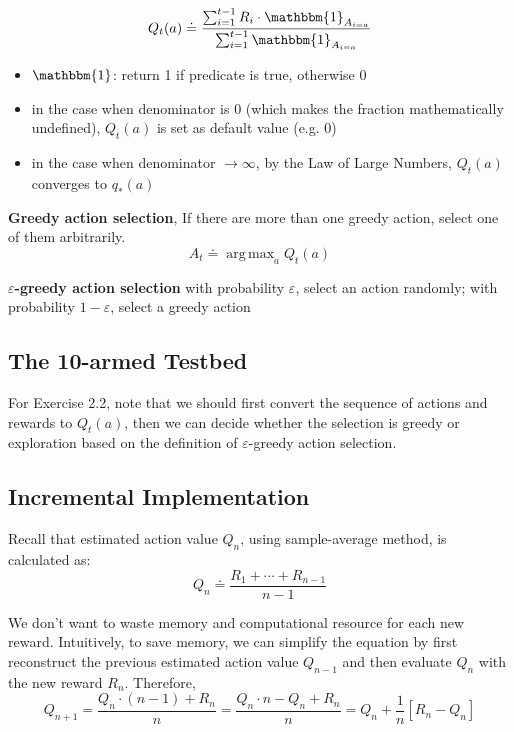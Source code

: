 \documentclass[lang=en,mode=geye,device=normal,color=blue,14pt]{elegantnote}
\DeclareMathOperator*{\1}{\mathbbm{1}}
\DeclareMathOperator*{\argmax}{arg\,max}
\begin{document}
$$ Q_t(a) \doteq \frac{\sum_{i=1}^{t-1}R_i \cdot \1_{A_{i=a}}}{\sum_{i=1}^{t-1}\1_{A_{i=a}}}$$

\begin{itemize}
	\item $\1$: return 1 if predicate is true, otherwise 0
	\item in the case when denominator is 0 (which makes the fraction mathematically undefined), $Q_t(a)$ is set as default value (e.g. 0)
	\item in the case when denominator $\rightarrow \infty$, by the Law of Large Numbers, $Q_t(a)$ converges to $q_*(a)$
\end{itemize}

\begin{definition}
\textbf{Greedy action selection}, If there are more than one greedy action, select one of them arbitrarily.
$$ A_t \doteq \argmax_{a} Q_t(a) $$
\end{definition}

\begin{definition}
\textbf{$\varepsilon$-greedy action selection} with probability $\varepsilon$, select an action randomly; with probability $1-\varepsilon$, select a greedy action
\end{definition}

\subsection{The 10-armed Testbed}

For Exercise 2.2, note that we should first convert the sequence of actions and rewards to $Q_t(a)$, then we can decide whether the selection is greedy or exploration based on the definition of $\varepsilon$-greedy action selection.

\subsection{Incremental Implementation}

Recall that estimated action value $Q_n$, using sample-average method, is calculated as:
$$ Q_n \doteq \frac{R_1 + \cdots + R_{n-1}}{n-1} $$

We don't want to waste memory and computational resource for each new reward.
Intuitively, to save memory, we can simplify the equation by first reconstruct the previous estimated action value $Q_{n-1}$ and then evaluate $Q_n$ with the new reward $R_n$.
Therefore,
$$ Q_{n+1} = \frac{Q_n \cdot (n-1) + R_n}{n} = \frac{Q_n \cdot n - Q_n + R_n}{n} = Q_n + \frac{1}{n}[R_n - Q_n] $$
\end{document}
